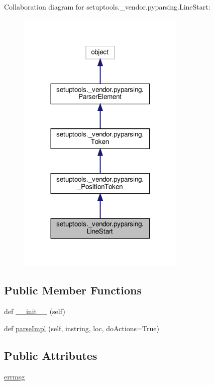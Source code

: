 Collaboration diagram for setuptools.\+\_\+vendor.\+pyparsing.\+Line\+Start\+:
\nopagebreak
\begin{figure}[H]
\begin{center}
\leavevmode
\includegraphics[width=227pt]{classsetuptools_1_1__vendor_1_1pyparsing_1_1LineStart__coll__graph}
\end{center}
\end{figure}
\subsection*{Public Member Functions}
\begin{DoxyCompactItemize}
\item 
def \hyperlink{classsetuptools_1_1__vendor_1_1pyparsing_1_1LineStart_a674ad57fddb39ceb1c77560f7bb2844f}{\+\_\+\+\_\+init\+\_\+\+\_\+} (self)
\item 
def \hyperlink{classsetuptools_1_1__vendor_1_1pyparsing_1_1LineStart_a263bb9c5972d8bb9097184c1a3879d0f}{parse\+Impl} (self, instring, loc, do\+Actions=True)
\end{DoxyCompactItemize}
\subsection*{Public Attributes}
\begin{DoxyCompactItemize}
\item 
\hyperlink{classsetuptools_1_1__vendor_1_1pyparsing_1_1LineStart_a24b64fc4f52322b55b5b9acaec9b3d87}{errmsg}
\end{DoxyCompactItemize}

